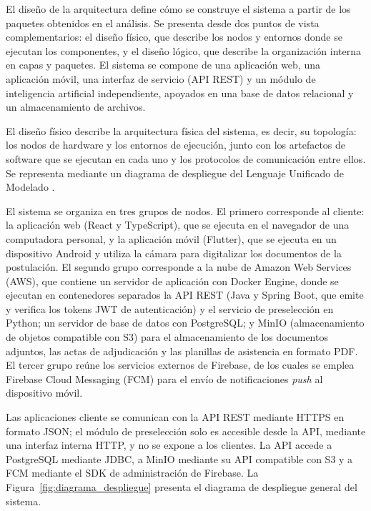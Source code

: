 \label{sec:cap7_arquitectura}

El diseño de la arquitectura define cómo se construye el sistema a partir de los paquetes obtenidos en el análisis. Se presenta desde dos puntos de vista complementarios: el diseño físico, que describe los nodos y entornos donde se ejecutan los componentes, y el diseño lógico, que describe la organización interna en capas y paquetes. El sistema se compone de una aplicación web, una aplicación móvil, una interfaz de servicio (API REST) y un módulo de inteligencia artificial independiente, apoyados en una base de datos relacional y un almacenamiento de archivos.

\label{sec:cap7_diseno_fisico}

El diseño físico describe la arquitectura física del sistema, es decir, su topología: los nodos de hardware y los entornos de ejecución, junto con los artefactos de software que se ejecutan en cada uno y los protocolos de comunicación entre ellos. Se representa mediante un diagrama de despliegue del Lenguaje Unificado de Modelado \parencite{booch2005uml, rumbaugh2004uml}.

El sistema se organiza en tres grupos de nodos. El primero corresponde al cliente: la aplicación web (React y TypeScript), que se ejecuta en el navegador de una computadora personal, y la aplicación móvil (Flutter), que se ejecuta en un dispositivo Android y utiliza la cámara para digitalizar los documentos de la postulación. El segundo grupo corresponde a la nube de Amazon Web Services (AWS), que contiene un servidor de aplicación con Docker Engine, donde se ejecutan en contenedores separados la API REST (Java y Spring Boot, que emite y verifica los tokens JWT de autenticación) y el servicio de preselección en Python; un servidor de base de datos con PostgreSQL; y MinIO (almacenamiento de objetos compatible con S3) para el almacenamiento de los documentos adjuntos, las actas de adjudicación y las planillas de asistencia en formato PDF. El tercer grupo reúne los servicios externos de Firebase, de los cuales se emplea Firebase Cloud Messaging (FCM) para el envío de notificaciones \textit{push} al dispositivo móvil.

Las aplicaciones cliente se comunican con la API REST mediante HTTPS en formato JSON; el módulo de preselección solo es accesible desde la API, mediante una interfaz interna HTTP, y no se expone a los clientes. La API accede a PostgreSQL mediante JDBC, a MinIO mediante su API compatible con S3 y a FCM mediante el SDK de administración de Firebase. La Figura~\ref{fig:diagrama_despliegue} presenta el diagrama de despliegue general del sistema.

